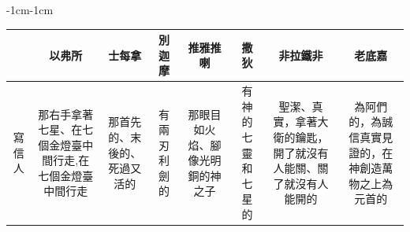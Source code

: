 
\begin{changemargin}{-1cm}{-1cm}
\begin{table} %
\centering
\begin{tabular}{cccccccc}\hline
&以弗所  & 士每拿 & 別迦摩&推雅推喇 & 撒狄&非拉鐵非  & 老底嘉  \\\hline
\multicolumn{1}{m{.3cm}|}{寫信人}&
\multicolumn{1}{m{3cm}|}{那右手拿著七星、在七個金燈臺中間行走,在七個金燈臺中間行走}  &
\multicolumn{1}{m{2cm}|}{那首先的、末後的、死過又活的}  &
 \multicolumn{1}{m{3cm}|}{有兩刃利劍的} &
 \multicolumn{1}{m{4cm}|}{那眼目如火焰、腳像光明銅的神之子}  &
 \multicolumn{1}{m{3cm}|}{有神的七靈和七星的}   &
 \multicolumn{1}{m{3.6cm}|}{聖潔、真實，拿著大衛的鑰匙，開了就沒有人能關、關了就沒有人能開的}  &  
 \multicolumn{1}{m{3cm}|}{為阿們的，為誠信真實見證的，在神創造萬物之上為元首的} \\\hline
 

\end{tabular}
\end{table}
\end{changemargin}
